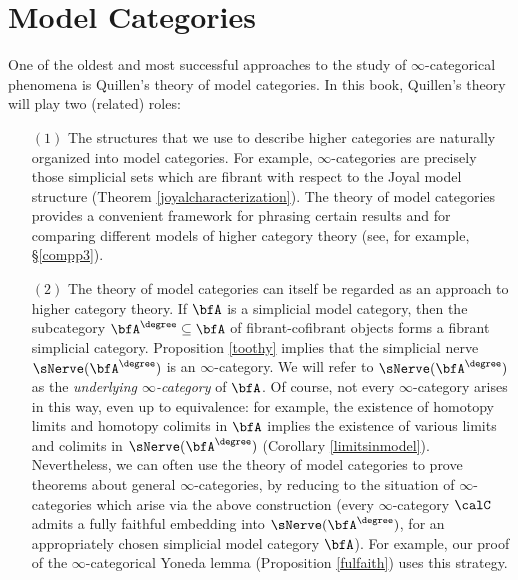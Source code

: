 \section{Model Categories}\label{appmodelcat}
\begin{Model Categories}
\begin{Already Read}
One of the oldest and most successful approaches to the study of
$\infty$-categorical phenomena is Quillen's theory of model
categories. In this book, Quillen's theory will play two (related) roles:

\begin{itemize}
\item[$(1)$] The structures that we use to describe higher categories are naturally organized into model categories. For example, $\infty$-categories are precisely those simplicial sets which are fibrant with respect to the Joyal model structure (Theorem \ref{joyalcharacterization}).
The theory of model categories provides a convenient framework for phrasing certain results and for comparing different models of higher category theory (see, for example, \S \ref{compp3}).

\item[$(2)$] The theory of model categories can itself be regarded as an approach to higher
category theory. If $\bfA$ is a simplicial model category, then the subcategory $\bfA^{\degree} \subseteq \bfA$ of fibrant-cofibrant objects forms a fibrant simplicial category. Proposition \ref{toothy} implies that the simplicial nerve $\sNerve(\bfA^{\degree})$ is an $\infty$-category. We will refer to $\sNerve(\bfA^{\degree})$ as the {\it underlying $\infty$-category} of
$\bfA$. Of course, not every $\infty$-category arises in this way, even up to equivalence: for example, the existence of homotopy limits and homotopy colimits in $\bfA$ implies the existence of various limits and colimits in $\sNerve(\bfA^{\degree})$ (Corollary \ref{limitsinmodel}). Nevertheless, we can often use the theory of model categories to prove theorems about general $\infty$-categories, by reducing to the situation of $\infty$-categories which arise via the above construction (every
$\infty$-category $\calC$ admits a fully faithful embedding into $\sNerve( \bfA^{\degree})$, for
an appropriately chosen simplicial model category $\bfA$). For example, our proof of the $\infty$-categorical Yoneda lemma (Proposition \ref{fulfaith}) uses this strategy.
\end{itemize}


\end{Already Read}
\end{Model Categories}
